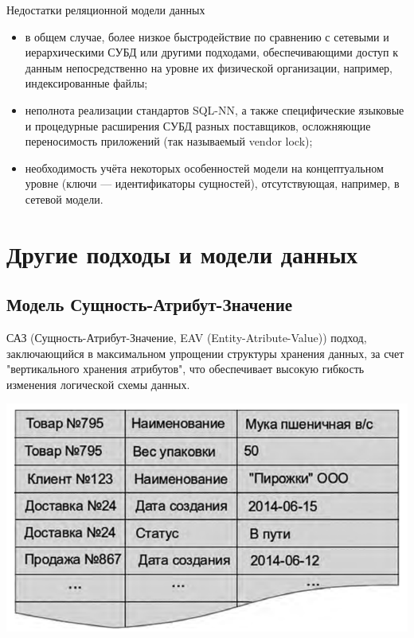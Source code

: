 \documentclass{beamer}
\begin{document}
\begin{frame}{}
\begin{block}{Недостатки реляционной модели данных}
\begin{itemize}
\item в общем случае, более низкое быстродействие по сравнению с
сетевыми и иерархическими СУБД или другими подходами,
обеспечивающими доступ к данным непосредственно на уровне их
физической организации, например, индексированные файлы;
\item неполнота реализации стандартов SQL-NN, а также
специфические языковые и процедурные расширения СУБД разных
поставщиков, осложняющие переносимость приложений (так
называемый vendor lock);
\item необходимость учёта некоторых особенностей модели на
концептуальном уровне (ключи — идентификаторы сущностей),
отсутствующая, например, в сетевой модели.
\end{itemize}
\end{block}
\end{frame}

\section{Другие подходы и модели данных}
\subsection{Модель Сущность-Атрибут-Значение}
\begin{frame}
\begin{block}{САЗ (Сущность-Атрибут-Значение, EAV (Entity-Atribute-Value))}
подход, заключающийся в максимальном упрощении структуры хранения данных, 
за счет "вертикального хранения атрибутов", что обеспечивает высокую гибкость 
изменения логической схемы данных.
\end{block}
\begin{center}
\includegraphics[scale=0.35]{images/eav-01.png}
\end{center}
\end{frame}
\end{document}
